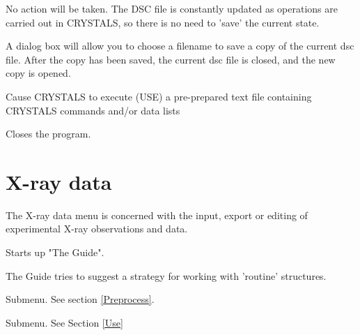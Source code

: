 \documentclass[10pt,a4paper]{report}
\begin{document}
\bigskip{}




No action will be taken. The DSC file is constantly updated as operations
are carried out in CRYSTALS, so there is no need to 'save' the current state.





\bigskip{}




A dialog box will allow you to choose a filename to save a copy of the
current dsc file. After the copy has been saved, the current dsc file is
closed, and the new copy is opened.





\bigskip{}




Cause CRYSTALS to execute (USE) a pre-prepared text file containing 
CRYSTALS commands and/or data lists





\bigskip{}




Closes the program.


\section{X-ray data}



The X-ray data menu is concerned with the input, export or editing of 
experimental X-ray observations and data.





\bigskip{}




Starts up "The Guide".

 
The Guide tries to suggest a strategy for working with 'routine' 
structures.





\bigskip{}




Submenu. See section \ref{Preprocess}.


\bigskip{}




Submenu. See Section \ref{Use}
\end{document}
